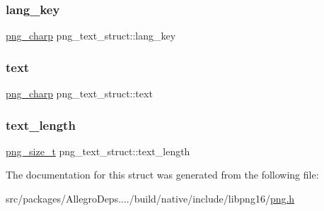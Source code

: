 \subsubsection{\texorpdfstring{lang\+\_\+key}{lang\_key}}
{\footnotesize\ttfamily \hyperlink{libpng16_2pngconf_8h_a0d08bb02251d02830803ff5d2d449750}{png\+\_\+charp} png\+\_\+text\+\_\+struct\+::lang\+\_\+key}

\mbox{\label{structpng__text__struct_a27492227bc525bee14abcc8002084edd}} 
\subsubsection{\texorpdfstring{text}{text}}
{\footnotesize\ttfamily \hyperlink{libpng16_2pngconf_8h_a0d08bb02251d02830803ff5d2d449750}{png\+\_\+charp} png\+\_\+text\+\_\+struct\+::text}

\mbox{\label{structpng__text__struct_a26312284ecc7a95e2168a29d0170b411}} 
\subsubsection{\texorpdfstring{text\+\_\+length}{text\_length}}
{\footnotesize\ttfamily \hyperlink{libpng16_2pngconf_8h_a975e35d0a699ea3b08b8feef90fd29eb}{png\+\_\+size\+\_\+t} png\+\_\+text\+\_\+struct\+::text\+\_\+length}



The documentation for this struct was generated from the following file\+:\begin{DoxyCompactItemize}
\item 
src/packages/\+Allegro\+Deps..../build/native/include/libpng16/\hyperlink{libpng16_2png_8h}{png.\+h}\end{DoxyCompactItemize}
